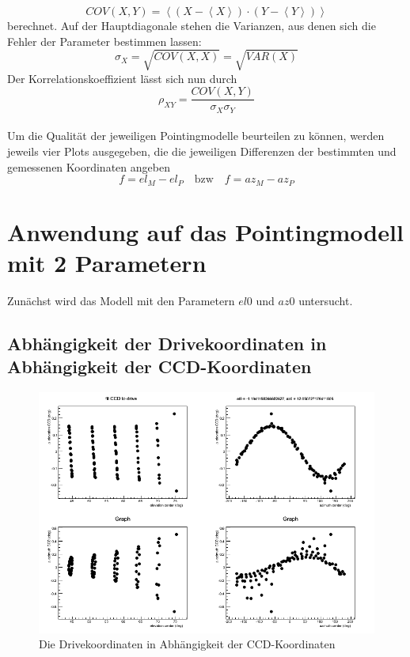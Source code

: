 \begin{equation}
COV(X,Y)=\left<\left(X-\left<X\right>\right)\cdot\left(Y-\left<Y\right>\right)\right>
\end{equation}
berechnet. Auf der Hauptdiagonale stehen die Varianzen, aus denen sich die Fehler der Parameter bestimmen lassen:
\begin{equation}
\sigma_X=\sqrt{COV(X,X)}=\sqrt{VAR(X)}
\end{equation}
Der Korrelationskoeffizient lässt sich nun durch
\begin{equation}
\rho_{XY}=\frac{COV(X,Y)}{\sigma_X\sigma_Y}
\end{equation}\\
Um die Qualität der jeweiligen Pointingmodelle beurteilen zu können, werden jeweils vier Plots ausgegeben, die die jeweiligen Differenzen der bestimmten und gemessenen Koordinaten angeben
\begin{equation}
f=el_M-el_P \quad \textrm{bzw} \quad f=az_M-az_P
\end{equation}
\section{Anwendung auf das Pointingmodell mit 2 Parametern}
Zunächst wird das Modell mit den Parametern $el0$ und $az0$ untersucht.
\subsection{Abhängigkeit der Drivekoordinaten in Abhängigkeit der CCD-Koordinaten}
\begin{figure}[htbp]
\centering
\includegraphics[width=\textwidth]{../341/run341C2D.png}
\caption{Die Drivekoordinaten in Abhängigkeit der CCD-Koordinaten}
\label{img:C2D}
\end{figure}
